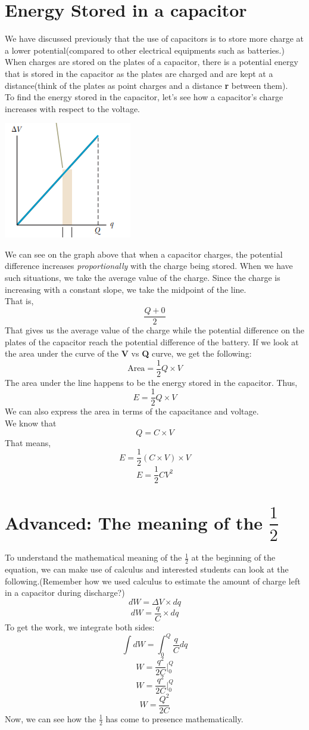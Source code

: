 \documentclass[9pt,addpoints]{exam}
\begin{document}
	\section*{Energy Stored in a capacitor}
	We have discussed previously that the use of capacitors is to store more charge at a lower potential(compared to other electrical equipments such as batteries.) When charges are stored on the plates of a capacitor, there is a potential energy that is stored in the capacitor as the plates are charged and are kept at a distance(think of the plates as point charges and a distance \textbf{r} between them). \\
	To find the energy stored in the capacitor, let's see how a capacitor's charge increases with respect to the voltage. \begin{center}
		\includegraphics[scale=0.7]{v_q_curve.png}
	\end{center}
	We can see on the graph above that when a capacitor charges, the potential difference increases \textit{proportionally} with the charge being stored. When we have such situations, we take the average value of the charge. Since the charge is increasing with a constant slope, we take the midpoint of the line. \\
	That is,
	$$\frac{Q + 0}{2}$$
	That gives us the average value  of the charge while the potential difference on the plates of the capacitor reach the potential difference of the battery. If we look at the area under the curve of the \textbf{V} vs \textbf{Q} curve, we get the following:
	$$\text{Area}=\frac{1}{2}Q\times V$$
	The area under the line happens to be the energy stored in the capacitor. Thus,
	$$E = \frac{1}{2}Q\times V$$
	We can also express the area in terms of the capacitance and voltage.
	\\
	\newline
	We know that $$Q = C \times V$$
	That means,
	$$E = \frac{1}{2}(C\times V)\times V$$
	$$E = \frac{1}{2}CV^2$$
	
	\section*{Advanced: The meaning of the $\dfrac{1}{2}$}
	To understand the mathematical meaning of the $\frac{1}{2}$ at the beginning of the equation, we can make use of calculus and interested students can look at the following.(Remember how we used calculus to estimate the amount of charge left in a capacitor during discharge?)
	$$dW = \varDelta V\times dq$$
	$$dW = \frac{q}{C}\times dq$$
	To get the work, we integrate both sides:
	$$\int dW =\int_{0}^{Q}\frac{q}{C}dq$$
	$$ W =\frac{q^2}{2C}\Big|_0^Q $$
	$$ W =\frac{q^2}{2C}\Big|_0^Q $$
	$$ W =\frac{Q^2}{2C}$$
	Now, we can see how the $\frac{1}{2}$ has come to presence mathematically.
\end{document}
